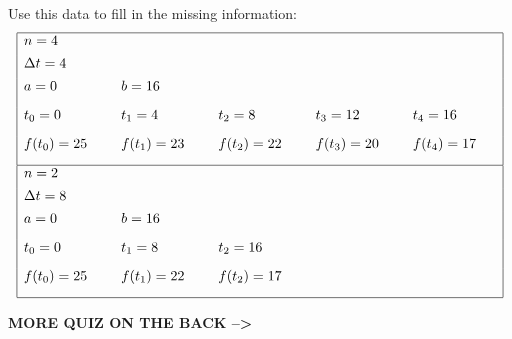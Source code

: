 \documentclass[11pt,letterpaper]{article}
\begin{document}
\begin{enumerate}
\begin{enumerate}
Use this data to fill in the missing information:
\[\begin{array}{| l l l l l |}
\hline
n=4 & & & & \\ [1ex]
\Delta t=4\hspace{0.5 cm} & & & & \\ [1ex]
a=0\hspace{0.5 cm} & b=16\hspace{0.5 cm} & & &\\ [2ex]
t_0=0\hspace{0.5 cm} & t_1=4\hspace{0.5 cm} & t_2=8\hspace{0.5 cm} & t_3=12\hspace{0.5 cm} & t_4=16\hspace{0.5 cm} \\ [2ex]
f(t_0)=25\hspace{0.5 cm} & f(t_1)=23\hspace{0.5 cm} & f(t_2)=22\hspace{0.5 cm} & f(t_3)=20\hspace{0.5 cm} & f(t_4)=17\hspace{0.5 cm} \\ [2ex]
\hline
 n=2 & & & & \\ [1ex]
\Delta t=8\hspace{1 cm} & & & & \\ [1ex]
a=0\hspace{0.5 cm} & b=16\hspace{0.5 cm} & & &\\ [2ex]
t_0=0\hspace{0.5 cm} & t_1=8\hspace{0.5 cm} & t_2=16\hspace{0.5 cm} &  &  \\ [2ex]
f(t_0)=25\hspace{0.5 cm} & f(t_1)=22\hspace{0.5 cm} & f(t_2)=17\hspace{0.5 cm} &  &  \\ [2ex]
\hline
\end{array}\]

\hfill{\bf MORE QUIZ ON THE BACK --\textgreater}
\vfill


\end{enumerate}
\end{enumerate}
\end{document}
